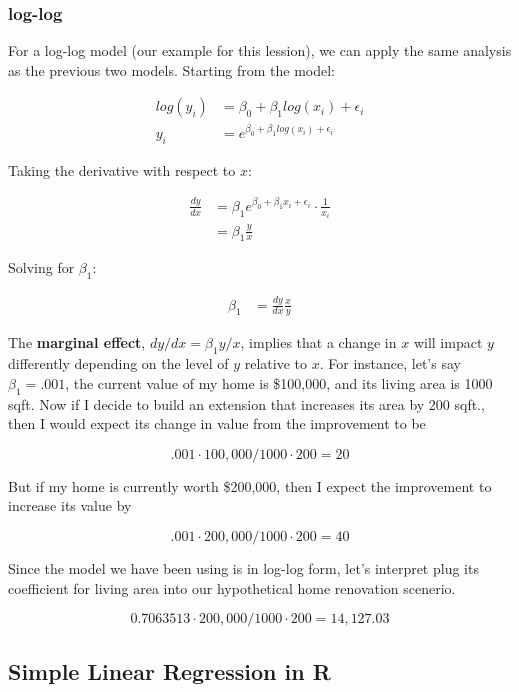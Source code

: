 \documentclass[10pt]{article}\usepackage[]{graphicx}\usepackage[]{color}
\begin{document}
\subsubsection*{log-log}

For a log-log model (our example for this lession), we can apply the same analysis as the previous two models. Starting from the model:

\begin{align}
log(y_i) &=  \beta_0 + \beta_1 log(x_i) + \epsilon_i \\
y_i &= e^{\beta_0 + \beta_1 log(x_i) + \epsilon_i}
\end{align}

Taking the derivative with respect to $x$:

\begin{align}
\frac{dy}{dx} &= \beta_1 e^{\beta_0 + \beta_1 x_i + \epsilon_i} \cdot \frac{1}{x_i} \\
 &= \beta_1 \frac{y}{x} 
\end{align}

Solving for $\beta_1$:

\begin{align}
 \beta_1 &= \frac{dy}{dx} \frac{x}{y}
\end{align}

The \textbf{marginal effect}, $dy / dx = \beta_1 y / x$, implies that a change in $x$ will impact $y$ differently depending on the level of $y$ relative to $x$. For instance, let's say $\beta_1 = .001$, the current value of my home is \$100,000, and its living area is 1000 sqft. Now if I decide to build an extension that increases its area by 200 sqft., then I would expect its change in value from the improvement to be 

$$.001 \cdot 100,000 / 1000 \cdot 200 = 20$$ 

But if my home is currently worth \$200,000, then I expect the improvement to increase its value by 

$$.001 \cdot 200,000/1000 \cdot 200 = 40$$

Since the model we have been using is in log-log form, let's interpret plug its coefficient for living area into our hypothetical home renovation scenerio.

$$0.7063513 \cdot 200,000/1000 \cdot 200 = 14,127.03$$


\subsection*{Simple Linear Regression in R }
\end{document}
